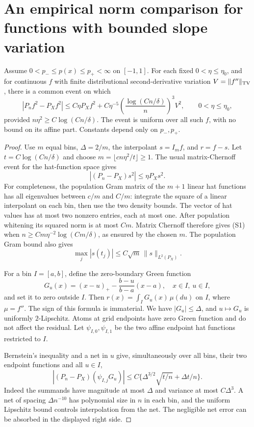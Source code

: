 \section{An empirical norm comparison for functions with bounded slope variation}
\label{sec:sharp-design}
Assume $0<p_-\le p(x)\le p_+<\infty$ on $[-1,1]$.
For each fixed $0<\eta\le\eta_0$, and for continuous $f$ with finite distributional second-derivative
variation $V=\|f''\|_{\rm TV}$, there is a common event on which
\[
 |P_nf^2-P_Xf^2|
 \le C\eta P_Xf^2+
 C\eta^{-5}\left(\frac{\log(Cn/\delta)}n\right)^3V^2,
 \qquad 0<\eta\le\eta_0, \tag{S}
\]
provided $n\eta^2\ge C\log(Cn/\delta)$.
The event is uniform over all such $f$, with no bound on its affine
part. Constants depend only on $p_-,p_+$.

\begin{proof}
Use $m$ equal bins, $\Delta=2/m$, the interpolant $s=I_m f$, and
$r=f-s$. Let $t=C\log(Cn/\delta)$ and choose
$m=\lfloor c n\eta^2/t\rfloor\ge1$. The usual matrix-Chernoff event
for the hat-function space gives
\[
 |(P_n-P_X)s^2|\le\eta P_Xs^2. \tag{S1}
\]
For completeness, the population Gram matrix of the $m+1$ linear hat
functions has all eigenvalues between $c/m$ and $C/m$: integrate the
square of a linear interpolant on each bin, then use the two density
bounds. The vector of hat values has at most two nonzero entries, each
at most one. After population whitening its squared norm is at most
$Cm$. Matrix Chernoff therefore gives (S1) when
$n\ge C m\eta^{-2}\log(Cm/\delta)$, as ensured by the chosen $m$.
The population Gram bound also gives
\[
 \max_j|s(t_j)|\le C\sqrt m\,\|s\|_{L^2(P_X)}. \tag{S2}
\]

For a bin $I=[a,b]$, define the zero-boundary Green function
\[
 G_u(x)=(x-u)_+
       -\frac{b-u}{b-a}(x-a),\quad x\in I,\ u\in I,
\]
and set it to zero outside $I$. Then
$r(x)=\int_I G_u(x)\,\mu(du)$ on $I$, where $\mu=f''$.
The sign of this formula is immaterial. We have
$|G_u|\le\Delta$, and $u\mapsto G_u$ is uniformly $2$-Lipschitz.
Atoms at grid endpoints have zero Green function and do not affect
the residual. Let $\psi_{I,0},\psi_{I,1}$ be the two affine endpoint
hat functions restricted to $I$.

Bernstein's inequality and a net in $u$ give, simultaneously over all
bins, their two endpoint functions and all $u\in I$,
\[
 |(P_n-P_X)(\psi_{I,j}G_u)|
 \le C\{\Delta^{3/2}\sqrt{t/n}+\Delta t/n\}. \tag{S3}
\]
Indeed the summands have magnitude at most $\Delta$ and variance
at most $C\Delta^3$. A net of spacing $\Delta n^{-10}$ has polynomial
size in $n$ in each bin, and the uniform Lipschitz bound controls
interpolation from the net. The negligible net error can be
absorbed in the displayed right side.


\end{proof}
